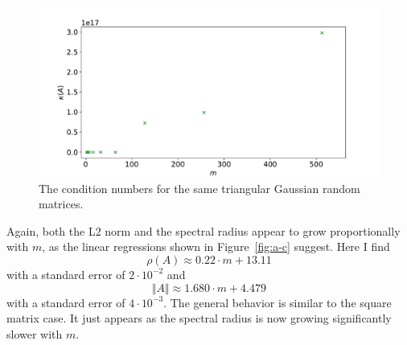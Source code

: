 \documentclass[a4paper, 11pt]{article}
\begin{document}
\begin{figure}
  \centering
  \includegraphics[width=\textwidth]{../2/triangular/cond.pdf}
  \caption{The condition numbers for the same triangular Gaussian random
  matrices.}
  \label{fig:d_cond}
\end{figure}

Again, both the L2 norm and the spectral radius appear to grow proportionally
with $m$, as the linear regressions shown in Figure~\ref{fig:a-c} suggest. Here
I find
\begin{equation}
  \rho(A) \approx 0.22\cdot m + 13.11
\end{equation}
with a standard error of $2\cdot 10^{-2}$ and
\begin{equation}
  \Vert A \Vert \approx 1.680\cdot m + 4.479
\end{equation}
with a standard error of $4\cdot 10^{-3}$. The general behavior is similar to
the square matrix case. It just appears as the spectral radius is now growing
significantly slower with $m$.
\end{document}
